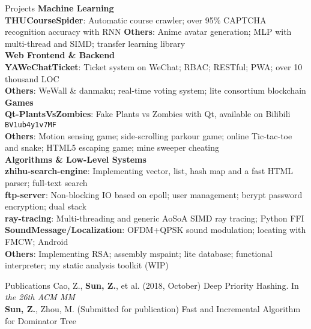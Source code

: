 \documentclass{resume}
\begin{document}
\begin{rSection}{Projects}
\hspace*{-0.2in}\textbf{Machine Learning} \\
\textbf{THUCourseSpider}: Automatic course crawler; over 95\% CAPTCHA recognition accuracy with RNN
\textbf{Others}: Anime avatar generation; MLP with multi-thread and SIMD; transfer learning library \\
\hspace*{-0.2in}\textbf{Web Frontend \& Backend} \\
\textbf{YAWeChatTicket}: Ticket system on WeChat; RBAC; RESTful; PWA; over 10 thousand LOC \\
\textbf{Others}: WeWall \& danmaku; real-time voting system; lite consortium blockchain \\
\hspace*{-0.2in}\textbf{Games} \\
\textbf{Qt-PlantsVsZombies}: Fake Plants vs Zombies with Qt, available on Bilibili \texttt{BV1ub4y1v7MF} \\
\textbf{Others}: Motion sensing game; side-scrolling parkour game; online Tic-tac-toe and snake; HTML5 escaping game; mine sweeper cheating \\
\hspace*{-0.2in}\textbf{Algorithms \& Low-Level Systems} \\
\textbf{zhihu-search-engine}: Implementing vector, list, hash map and a fast HTML parser; full-text search \\
\textbf{ftp-server}: Non-blocking IO based on epoll; user management; bcrypt password encryption; dual stack \\
\textbf{ray-tracing}: Multi-threading and generic AoSoA SIMD ray tracing; Python FFI \\
\textbf{SoundMessage/Localization}: OFDM+QPSK sound modulation; locating with FMCW; Android \\
\textbf{Others}: Implementing RSA; assembly mspaint; lite database; functional interpreter; my static analysis toolkit (WIP)
\end{rSection}

\begin{rSection}{Publications}
Cao, Z., \textbf{Sun, Z.}, et al. (2018, October) Deep Priority Hashing. In \textit{the 26th ACM MM} \\
\textbf{Sun, Z.}, Zhou, M. (Submitted for publication) Fast and Incremental Algorithm for Dominator Tree
\end{rSection}
\end{document}

